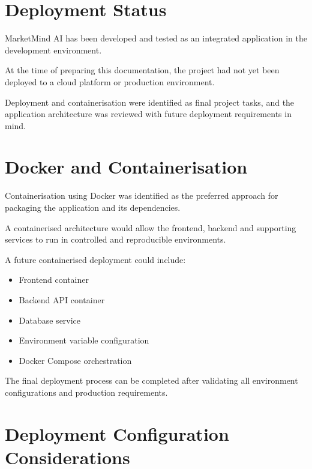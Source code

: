 \documentclass[12pt,a4paper]{report}
\begin{document}
\section{Deployment Status}

MarketMind AI has been developed and tested as an integrated application
in the development environment.

At the time of preparing this documentation, the project had not yet
been deployed to a cloud platform or production environment.

Deployment and containerisation were identified as final project tasks,
and the application architecture was reviewed with future deployment
requirements in mind.



\section{Docker and Containerisation}

Containerisation using Docker was identified as the preferred approach
for packaging the application and its dependencies.

A containerised architecture would allow the frontend, backend and
supporting services to run in controlled and reproducible environments.

A future containerised deployment could include:

\begin{itemize}
    \item Frontend container
    \item Backend API container
    \item Database service
    \item Environment variable configuration
    \item Docker Compose orchestration
\end{itemize}

The final deployment process can be completed after validating all
environment configurations and production requirements.



\section{Deployment Configuration Considerations}
\end{document}
